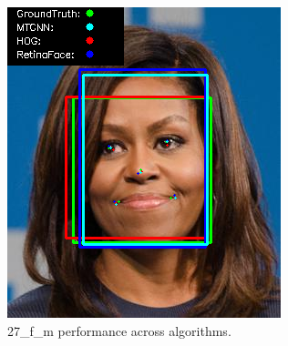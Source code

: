\documentclass{l4proj}
\begin{document}
\begin{appendices}
\begin{figure}[h!]
\begin{minipage}{0.49\textwidth}
     \includegraphics[width=\textwidth]{images/appendix/27.png}
    \caption{27\_f\_m performance across algorithms.}
    \label{whoopi_result}
  \end{minipage}
\end{figure}


\end{appendices}
\end{document}
